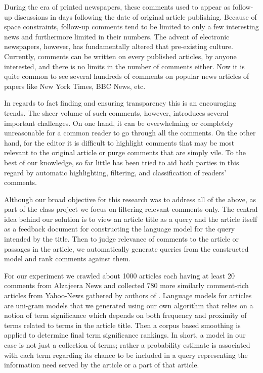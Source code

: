 \documentclass[article]{IEEEtran}
\begin{document}
During the era of printed newspapers, these comments used to appear as follow-up  discussions in days following the date of original article publishing. Because of space constraints, follow-up comments tend to be limited to only a few interesting news and furthermore limited in their numbers. The advent of electronic newspapers, however, has fundamentally altered that pre-existing culture. Currently, comments can be written on every published articles, by anyone interested,  and there is no limits in the number of comments either. Now it is quite common to see several hundreds of comments on popular news articles of papers like New York Times, BBC News, etc.

In regards to fact finding and ensuring transparency this is an encouraging trends. The sheer volume of such comments, however, introduces several important  challenges. On one hand, it can be overwhelming or completely unreasonable for a common reader to go through all the comments. On the other hand, for the editor it is difficult to highlight comments that may be most relevant to the  original article or purge comments that are simply vile. To the best of our  knowledge, so far little has been tried to aid both parties in this regard by automatic highlighting, filtering, and classification of readers' comments.

Although our broad objective for this research was to address all of the above, as part of the class project we focus on filtering relevant comments only. The central idea behind our solution is to view an article title as a query and the article itself as a feedback document for constructing the language model for the query intended by the title. Then to judge relevance of comments to the article or passages in the article, we automatically generate queries from the constructed model and rank comments against them.       

For our experiment we crawled about 1000 articles each having at least 20 comments from Alzajeera News and collected 780 more similarly comment-rich articles from Yahoo-News gathered by authors of \cite{Das:2014:GBC:2556195.2556231}. Language models for articles are uni-gram models that we generated using our own algorithm that relies on a notion of term significance which depends on both frequency and proximity of terms related to terms in the article title. Then a corpus based smoothing is applied to determine final term significance rankings. In short, a model in our case is not just a collection of terms; rather a probability estimate is associated with each term regarding its chance to be included in a query representing the information need served by the article or a part of that article. 
\end{document}
